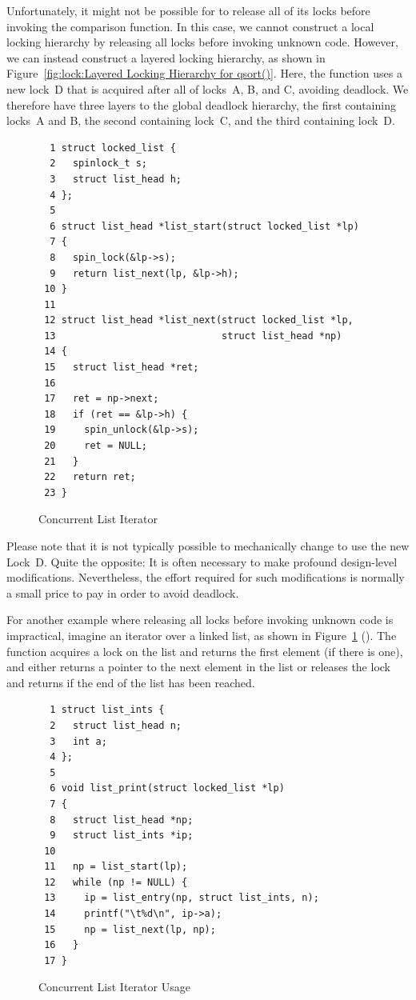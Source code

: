 Unfortunately, it might not be possible for  to release
all of its locks before invoking the comparison function.
In this case, we cannot construct a local locking hierarchy by
releasing all locks before invoking unknown code.
However, we can instead construct a layered locking hierarchy, as shown in
Figure~\ref{fig:lock:Layered Locking Hierarchy for qsort()}.
Here, the  function uses a new lock~D that is acquired after
all of locks~A, B, and C, avoiding deadlock.
We therefore have three layers to the global deadlock hierarchy, the
first containing locks~A and B, the second containing lock~C, and
the third containing lock~D.

\begin{figure}[tbp]
{ \scriptsize
\begin{verbatim}
  1 struct locked_list {
  2   spinlock_t s;
  3   struct list_head h;
  4 };
  5 
  6 struct list_head *list_start(struct locked_list *lp)
  7 {
  8   spin_lock(&lp->s);
  9   return list_next(lp, &lp->h);
 10 }
 11 
 12 struct list_head *list_next(struct locked_list *lp,
 13                             struct list_head *np)
 14 {
 15   struct list_head *ret;
 16 
 17   ret = np->next;
 18   if (ret == &lp->h) {
 19     spin_unlock(&lp->s);
 20     ret = NULL;
 21   }
 22   return ret;
 23 }
\end{verbatim}
}
\caption{Concurrent List Iterator}
\label{fig:locking:Concurrent List Iterator}
\end{figure}

Please note that it is not typically possible to mechanically
change  to use the new Lock~D.
Quite the opposite: It is often necessary to make profound design-level
modifications.
Nevertheless, the effort required for such modifications is normally
a small price to pay in order to avoid deadlock.

For another example where releasing all locks before invoking unknown
code is impractical, imagine an iterator over a linked list, as shown in
Figure~\ref{fig:locking:Concurrent List Iterator} ().
The  function acquires a lock on the list and returns
the first element (if there is one), and
 either returns a pointer to the next element in the list
or releases the lock and returns  if the end of the list has
been reached.

\begin{figure}[tbp]
{ \scriptsize
\begin{verbatim}
  1 struct list_ints {
  2   struct list_head n;
  3   int a;
  4 };
  5 
  6 void list_print(struct locked_list *lp)
  7 {
  8   struct list_head *np;
  9   struct list_ints *ip;
 10 
 11   np = list_start(lp);
 12   while (np != NULL) {
 13     ip = list_entry(np, struct list_ints, n);
 14     printf("\t%d\n", ip->a);
 15     np = list_next(lp, np);
 16   }
 17 }
\end{verbatim}
}
\caption{Concurrent List Iterator Usage}
\label{fig:locking:Concurrent List Iterator Usage}
\end{figure}

